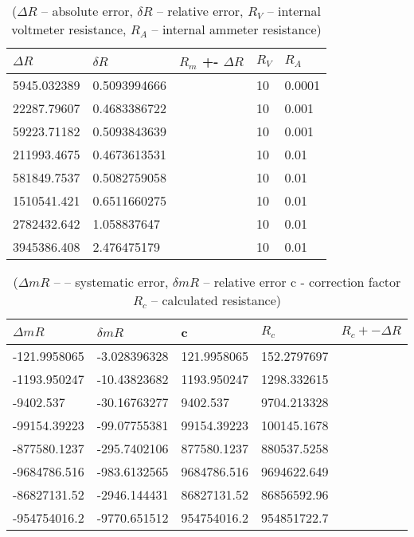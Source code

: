 \begin{table}[!ht]
    \centering
    \begin{tabular}{|l|l|l|l|l|}
    \hline
        $\Delta R$ & $\delta R$ & $R_m$ +- $\Delta R$ & $R_V$ & $R_A$ \\ \hline
        5945.032389 & 0.5093994666 & ~ & 10 & 0.0001 \\ \hline
        22287.79607 & 0.4683386722 & ~ & 10 & 0.001 \\ \hline
        59223.71182 & 0.5093843639 & ~ & 10 & 0.001 \\ \hline
        211993.4675 & 0.4673613531 & ~ & 10 & 0.01 \\ \hline
        581849.7537 & 0.5082759058 & ~ & 10 & 0.01 \\ \hline
        1510541.421 & 0.6511660275 & ~ & 10 & 0.01 \\ \hline
        2782432.642 & 1.058837647 & ~ & 10 & 0.01 \\ \hline
        3945386.408 & 2.476475179 & ~ & 10 & 0.01 \\ \hline
    \end{tabular}
    \caption{($\Delta R$ -- absolute error, $\delta R$ -- relative error, $R_V$ -- internal voltmeter resistance, $R_A$ -- internal ammeter resistance)}
\end{table}

\begin{table}[!ht]
    \centering
    \begin{tabular}{|l|l|l|l|l|}
    \hline
        $\Delta mR$ & $\delta mR$ & c & $R_c$ & $R_c+- \Delta R$ \\ \hline
        -121.9958065 & -3.028396328 & 121.9958065 & 152.2797697 & ~ \\ \hline
        -1193.950247 & -10.43823682 & 1193.950247 & 1298.332615 & ~ \\ \hline
        -9402.537 & -30.16763277 & 9402.537 & 9704.213328 & ~ \\ \hline
        -99154.39223 & -99.07755381 & 99154.39223 & 100145.1678 & ~ \\ \hline
        -877580.1237 & -295.7402106 & 877580.1237 & 880537.5258 & ~ \\ \hline
        -9684786.516 & -983.6132565 & 9684786.516 & 9694622.649 & ~ \\ \hline
        -86827131.52 & -2946.144431 & 86827131.52 & 86856592.96 & ~ \\ \hline
        -954754016.2 & -9770.651512 & 954754016.2 & 954851722.7 \\ \hline
    \end{tabular}
    \caption{($\Delta mR$ -- – systematic error, $\delta mR$ -- relative error  c - correction factor  $R_c$ -- calculated resistance)}

\end{table}



